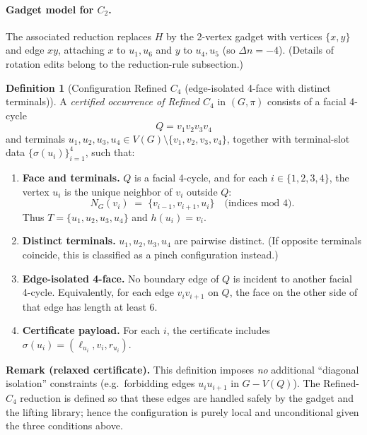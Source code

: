 \documentclass[12pt]{article}
\theoremstyle{definition}
\newtheorem{definition}[theorem]{Definition}
\newcommand{\CtwoGadgetVertices}{2}
\newcommand{\CtwoDelta}{-4}
\begin{document}
\paragraph{Gadget model for $C_2$.}
The associated reduction replaces $H$ by the \CtwoGadgetVertices-vertex gadget with vertices $\{x,y\}$ and edge $xy$, attaching $x$ to $u_1,u_6$ and $y$ to $u_4,u_5$ (so $\Delta n = \CtwoDelta$). 
(Details of rotation edits belong to the reduction-rule subsection.)

\medskip

\begin{definition}[Configuration Refined $C_4$ (edge-isolated 4-face with distinct terminals)]
\label{def:refinedC4-occ}
A \emph{certified occurrence of Refined $C_4$} in $(G,\pi)$ consists of a facial
4-cycle
\[
Q=v_1v_2v_3v_4
\]
and terminals $u_1,u_2,u_3,u_4\in V(G)\setminus\{v_1,v_2,v_3,v_4\}$,
together with terminal-slot data $\{\sigma(u_i)\}_{i=1}^4$, such that:

\begin{enumerate}
\item \textbf{Face and terminals.}
$Q$ is a facial 4-cycle, and for each $i\in\{1,2,3,4\}$,
the vertex $u_i$ is the unique neighbor of $v_i$ outside $Q$:
\[
N_G(v_i)\;=\;\{v_{i-1},v_{i+1},u_i\}\quad\text{(indices mod $4$)}.
\]
Thus $T=\{u_1,u_2,u_3,u_4\}$ and $h(u_i)=v_i$.

\item \textbf{Distinct terminals.}
$u_1,u_2,u_3,u_4$ are pairwise distinct.
(If opposite terminals coincide, this is classified as a pinch configuration instead.)

\item \textbf{Edge-isolated 4-face.}
No boundary edge of $Q$ is incident to another facial 4-cycle.
Equivalently, for each edge $v_iv_{i+1}$ on $Q$, the face on the other side of that edge
has length at least $6$.

\item \textbf{Certificate payload.}
For each $i$, the certificate includes $\sigma(u_i)=(\ell_{u_i},v_i,r_{u_i})$.
\end{enumerate}

\smallskip
\noindent
\textbf{Remark (relaxed certificate).}
This definition imposes \emph{no} additional ``diagonal isolation''
constraints (e.g.\ forbidding edges $u_iu_{i+1}$ in $G-V(Q)$). The Refined-$C_4$
reduction is defined so that these edges are handled safely by the gadget and
the lifting library; hence the configuration is purely local and unconditional
given the three conditions above.
\end{definition}
\end{document}
